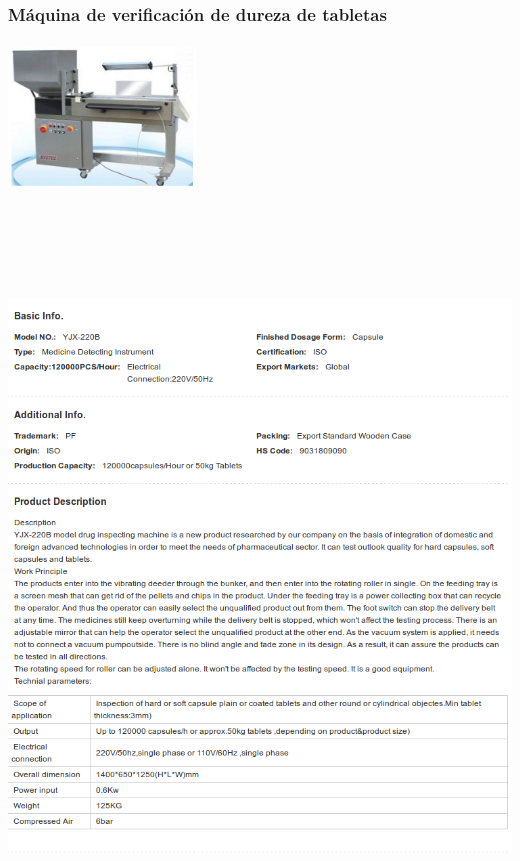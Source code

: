 \subsubsection{Máquina de verificación de dureza de tabletas}
\includegraphics[width=5cm,height=4cm,keepaspectratio]{Datasheets/3Foto.png} 
\\
\includegraphics[width=15cm,height=20cm,keepaspectratio]{Datasheets/3MaquinaVerificacion.png} 
\newpage

